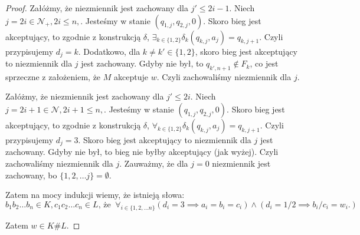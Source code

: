 \documentclass{article}
\theoremstyle{definition}
\theoremstyle{remark}
\begin{document}
\begin{proof}
    Załóżmy, że niezmiennik jest zachowany dla \(j' \leq 2i-1\). Niech \(j=2i \in
    \mathcal{N}_+, 2i \leq n,\). Jesteśmy w stanie \( \left(q_{1,j}, q_{2,j}, 0
    \right) \). Skoro bieg jest akceptujący, to zgodnie z konstrukcją \(\delta\),
    \( \exists _{k \in \{1,2\}} \delta_k(q_{k,j}, a_j) = q_{k, j+1} \). Czyli
    przypisujemy \(d_j = k\). Dodatkowo, dla \(k \neq k' \in \{ 1, 2 \} \), skoro
    bieg jest akceptujący to niezmiennik dla \(j\) jest zachowany. Gdyby nie był,
    to \(q_{k',n+1} \notin F_k\), co jest sprzeczne z założeniem, że \(M\)
    akceptuje \(w\). Czyli zachowaliśmy niezmiennik dla \(j\).

    Załóżmy, że niezmiennik jest zachowany dla \(j' \leq 2i\). Niech \(j=2i+1 \in
    \mathcal{N}, 2i+1 \leq n,\). Jesteśmy w stanie \( \left(q_{1,j}, q_{2,j}, 0
    \right) \). Skoro bieg jest akceptujący, to zgodnie z konstrukcją \(\delta\),
    \( \forall _{k \in \{1,2\}} \delta_k(q_{k,j}, a_j) = q_{k, j+1} \). Czyli
    przypisujemy \(d_j = 3\). Skoro bieg jest akceptujący to niezmiennik dla \(j\)
    jest zachowany. Gdyby nie był, to bieg nie byłby akceptujący (jak wyżej). Czyli
    zachowaliśmy niezmiennik dla \(j\). Zauważmy, że dla \(j = 0\) niezmiennik jest
    zachowany, bo \(\{1, 2, \ldots j\} = \emptyset\).

    Zatem na mocy indukcji wiemy, że istnieją słowa:
    \[ b_1 b_2 \ldots b_n \in K, c_1 c_2 \ldots c_n \in L \text{, że } \ \forall_{i \in \{1,2,\ldots n\}} \left( d_i = 3 \implies a_i = b_i = c_i \right) \land \left( d_i = 1/2 \implies b_i/c_i = w_i. \right) \]

    Zatem \(w \in K \# L\).

\end{proof}
\end{document}
